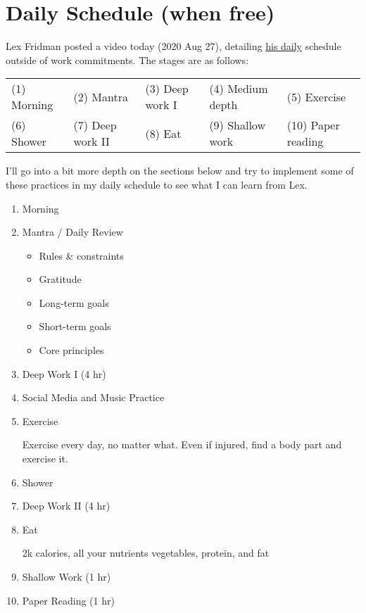 \section{Daily Schedule (when free)}

Lex Fridman posted a video today (2020 Aug 27), detailing  \href{https://youtu.be/0m3hGZvD-0s}{his daily} schedule outside of work commitments. The stages are as follows:

\begin{tabular}{lllll}
	(1) Morning & (2) Mantra  &  (3) Deep work I & (4) Medium depth  & (5) Exercise \\
	(6) Shower & (7) Deep work II & (8) Eat & (9) Shallow work  & (10) Paper reading \\
\end{tabular}

I'll go into a bit more depth on the sections below and try to implement some of these practices in my daily schedule to see what I can learn from Lex.

\begin{enumerate}
\item
	Morning

\item
	Mantra / Daily Review
	\begin{itemize}
	\item
		Rules \& constraints
	\item
		Gratitude
	\item
		Long-term goals
	\item
		Short-term goals
	\item
		Core principles
	\end{itemize}

\item
	Deep Work I (4 hr)

\item
	Social Media and Music Practice

\item
	Exercise

	Exercise every day, no matter what. Even if injured, find a body part and exercise it.

\item
	Shower

\item
	Deep Work II (4 hr)

\item
	Eat

	2k calories, all your nutrients
	vegetables, protein, and fat

\item
	Shallow Work (1 hr)

\item
	Paper Reading (1 hr)
\end{enumerate}



